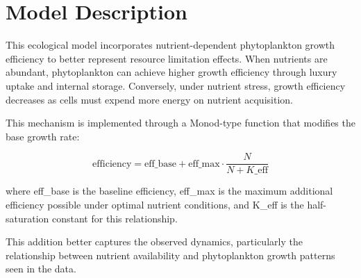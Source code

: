\section{Model Description}

This ecological model incorporates nutrient-dependent phytoplankton growth efficiency to better represent resource limitation effects. When nutrients are abundant, phytoplankton can achieve higher growth efficiency through luxury uptake and internal storage. Conversely, under nutrient stress, growth efficiency decreases as cells must expend more energy on nutrient acquisition.

This mechanism is implemented through a Monod-type function that modifies the base growth rate:

\[ \text{efficiency} = \text{eff\_base} + \text{eff\_max} \cdot \frac{N}{N + K\_\text{eff}} \]

where eff_base is the baseline efficiency, eff_max is the maximum additional efficiency possible under optimal nutrient conditions, and K_eff is the half-saturation constant for this relationship.

This addition better captures the observed dynamics, particularly the relationship between nutrient availability and phytoplankton growth patterns seen in the data.
